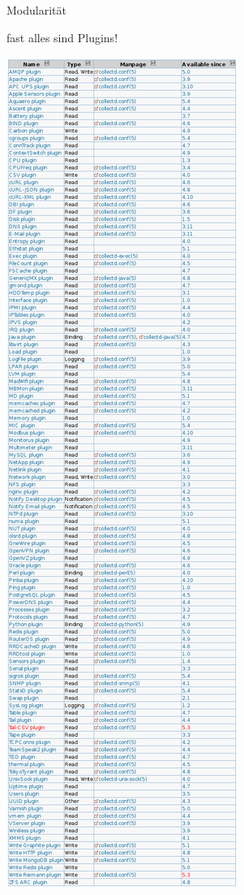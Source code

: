 \documentclass[ngerman,compress,aspectratio=169]{beamer}
\begin{document}
\begin{frame}{Modularit\"at}
	\begin{center}
		fast alles sind Plugins!
	\end{center}
	\begin{center}
		\includegraphics[scale=0.40]{plugins}
	\end{center}
\end{frame}
\end{document}
